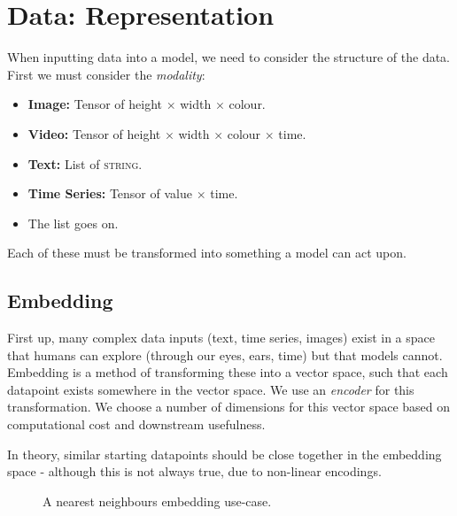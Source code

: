 \chapter{Data: Representation}

When inputting data into a model, we need to consider the structure of the data.
First we must consider the \textit{modality}:
\begin{itemize}
    \item \textbf{Image:} Tensor of height $\times$ width $\times$ colour.
    \item \textbf{Video:} Tensor of height $\times$ width $\times$ colour $\times$ time.
    \item \textbf{Text:} List of \textsc{string}. 
    \item \textbf{Time Series:} Tensor of value $\times$ time. 
    \item The list goes on.
\end{itemize}
Each of these must be transformed into something a model can act upon.

\section{Embedding}
\label{sec:representation-embeddings-as-operational-geometry}
First up, many complex data inputs (text, time series, images) exist in a space that humans can explore (through our eyes, ears, time) but that models cannot.
Embedding is a method of transforming these into a vector space, such that each datapoint exists somewhere in the vector space.
We use an \textit{encoder} for this transformation.
We choose a number of dimensions for this vector space based on computational cost and downstream usefulness.

In theory, similar starting datapoints should be close together in the embedding space - although this is not always true, due to non-linear encodings.

\begin{figure}[htbp]
    \centering
    \caption{A nearest neighbours embedding use-case.}
\end{figure}


